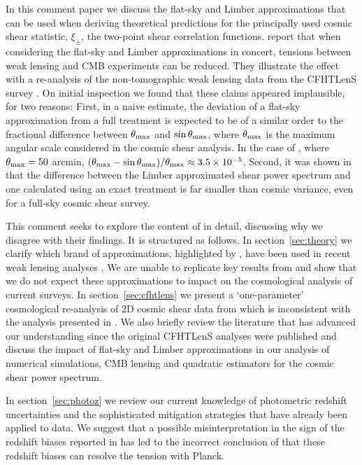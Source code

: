 \documentclass[a4paper, preprint, fleqn, usenatbib]{aastex}
\begin{document}
In this comment paper we discuss the flat-sky and Limber approximations that can be used when deriving theoretical predictions for the principally used cosmic shear statistic, $\xi_\pm$, the two-point shear correlation functions.  \citet{kitching/etal:2016} report that when considering the flat-sky and Limber approximations in concert, tensions between weak lensing and CMB experiments can be reduced. They illustrate the effect with a re-analysis of the non-tomographic weak lensing data from the CFHTLenS survey \citep{kilbinger/etal:2013}.    On initial inspection we found that these claims appeared implausible, for two reasons: First, in a naive estimate, the deviation of a flat-sky approximation from a full treatment is expected to be of a similar order to the fractional difference between $\theta_{\rm max}$ and $\sin\theta_{\rm max}$,
where $\theta_{\rm max}$ is the maximum angular scale considered in the cosmic shear analysis. In the case of \citet{hildebrandt/etal:2016}, where $\theta_{\rm max}=50$ arcmin, $(\theta_{\rm max} - \sin\theta_{\rm max})/\theta_{\rm max} \approx 3.5 \times 10^{-5}$.  Second, it was shown in \citet[][see their Fig.3]{giannantonio/etal:2012} that the difference between the Limber approximated shear power spectrum and one calculated using an exact treatment is far smaller than cosmic variance, even for a full-sky cosmic shear survey.

This comment seeks to explore the content of \citet{kitching/etal:2016} in detail, discussing why we disagree with their findings.  It is structured as follows.  In section~\ref{sec:theory} we clarify which brand of approximations, highlighted by \citet{kitching/etal:2016}, have been used in recent weak lensing analyses \citep{joudaki/etal:2016, hildebrandt/etal:2016, joudaki/etal:2017}.  We are unable to replicate key results from \citet{kitching/etal:2016} and show that we do not expect these approximations to impact on the cosmological analysis of current surveys.  In section~\ref{sec:cfhtlens} we present a `one-parameter' cosmological re-analysis of 2D cosmic shear data from \citet{kilbinger/etal:2013} which is inconsistent with the analysis presented in \citet{kitching/etal:2016}.  We also briefly review the literature that has advanced our understanding since the original CFHTLenS analyses were published and discuss the impact of flat-sky and Limber approximations in our analysis of numerical simulations, CMB lensing and quadratic estimators for the cosmic shear power spectrum.

In section~\ref{sec:photoz} we review our current knowledge of photometric redshift uncertainties and the sophisticated mitigation strategies that have already been applied to data.  We suggest that a possible misinterpretation in the sign of the redshift biases reported in \citet{choi/etal:2016} has led to the incorrect conclusion of \citet{kitching/etal:2016} that these redshift biases can resolve the tension with Planck.  
\end{document}
